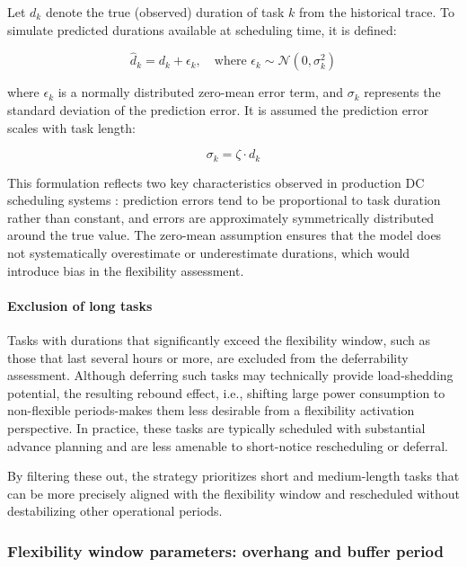 \documentclass[preprint,12pt]{elsarticle}
\begin{document}
Let $d_k$ denote the true (observed) duration of task $k$ from the historical trace. To simulate predicted durations available at scheduling time, it is defined:

\begin{equation}
    \hat{d}_k = d_k + \epsilon_k, \quad \text{where } \epsilon_k \sim \mathcal{N}(0, \sigma_k^2)
\end{equation}

where $\epsilon_k$ is a normally distributed zero-mean error term, and $\sigma_k$ represents the standard deviation of the prediction error. It is assumed the prediction error scales with task length:

\begin{equation}
    \sigma_k = \zeta \cdot d_k
\end{equation}

This formulation reflects two key characteristics observed in production DC scheduling systems \cite{Hu2021, Yeung2022}: prediction errors tend to be proportional to task duration rather than constant, and errors are approximately symmetrically distributed around the true value. The zero-mean assumption ensures that the model does not systematically overestimate or underestimate durations, which would introduce bias in the flexibility assessment. 

\paragraph{Exclusion of long tasks}
Tasks with durations that significantly exceed the flexibility window, such as those that last several hours or more, are excluded from the deferrability assessment. Although deferring such tasks may technically provide load-shedding potential, the resulting rebound effect, i.e., shifting large power consumption to non-flexible periods-makes them less desirable from a flexibility activation perspective. In practice, these tasks are typically scheduled with substantial advance planning and are less amenable to short-notice rescheduling or deferral.

By filtering these out, the strategy prioritizes short and medium-length tasks that can be more precisely aligned with the flexibility window and rescheduled without destabilizing other operational periods.


\subsubsection{Flexibility window parameters: overhang and buffer period}
\end{document}
